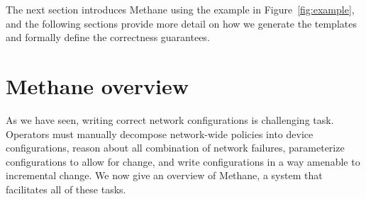 \documentclass{sig-alternate-10pt}
\newcommand{\sysname}{{\small \sf Methane}\xspace}
\newcommand{\CD}[1]{\texttt{\small #1}}  %
\newcommand{\KW}[1]{\texttt{\small\bfseries{#1}}}
\newcommand{\True}{\CD{true}}
\newcommand{\Define}{\KW{define}}
\newcommand{\Prefer}{\texttt{>>}}
\newcommand{\Path}{\texttt{=>}}
\newcommand{\Exit}{\KW{exit}}
\newcommand{\End}{\KW{end}}
\begin{document}
The next section introduces \sysname using the example in Figure~\ref{fig:example}, and the following sections provide more detail on how we generate the templates and formally define the correctness guarantees.


%
%
%
%

\section{Methane overview}
\label{sec:propane}

As we have seen, writing correct network configurations is challenging task.
Operators must manually decompose network-wide policies into device configurations,
reason about all combination of network failures, parameterize configurations to
allow for change, and write configurations in a way amenable to incremental change.
We now give an overview of \sysname, a system that facilitates all of these tasks.



\end{document}
